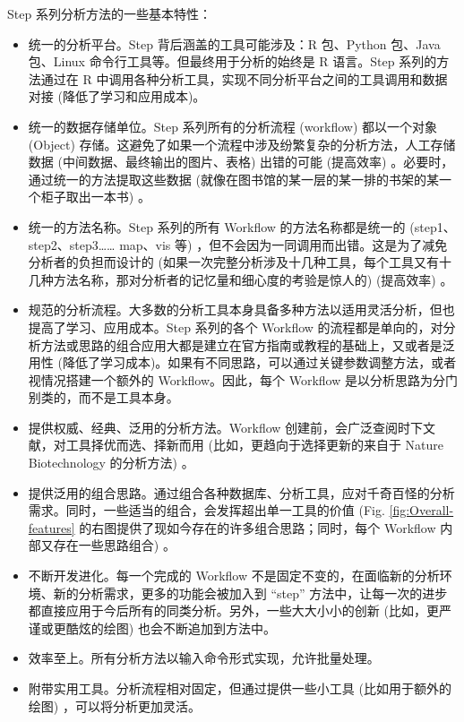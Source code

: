 \documentclass[
]{article}
\begin{document}
Step 系列分析方法的一些基本特性：

\begin{itemize}
\item
  统一的分析平台。Step 背后涵盖的工具可能涉及：R 包、Python 包、Java 包、Linux 命令行工具等。但最终用于分析的始终是 R 语言。Step 系列的方法通过在 R 中调用各种分析工具，实现不同分析平台之间的工具调用和数据对接 (降低了学习和应用成本)。
\item
  统一的数据存储单位。Step 系列所有的分析流程 (workflow) 都以一个对象 (Object) 存储。这避免了如果一个流程中涉及纷繁复杂的分析方法，人工存储数据 (中间数据、最终输出的图片、表格) 出错的可能 (提高效率) 。必要时，通过统一的方法提取这些数据 (就像在图书馆的某一层的某一排的书架的某一个柜子取出一本书) 。
\item
  统一的方法名称。Step 系列的所有 Workflow 的方法名称都是统一的 (step1、step2、step3\ldots\ldots{} map、vis 等) ，但不会因为一同调用而出错。这是为了减免分析者的负担而设计的 (如果一次完整分析涉及十几种工具，每个工具又有十几种方法名称，那对分析者的记忆量和细心度的考验是惊人的) (提高效率) 。
\item
  规范的分析流程。大多数的分析工具本身具备多种方法以适用灵活分析，但也提高了学习、应用成本。Step 系列的各个 Workflow 的流程都是单向的，对分析方法或思路的组合应用大都是建立在官方指南或教程的基础上，又或者是泛用性 (降低了学习成本)。如果有不同思路，可以通过关键参数调整方法，或者视情况搭建一个额外的 Workflow。因此，每个 Workflow 是以分析思路为分门别类的，而不是工具本身。
\item
  提供权威、经典、泛用的分析方法。Workflow 创建前，会广泛查阅时下文献，对工具择优而选、择新而用 (比如，更趋向于选择更新的来自于 Nature Biotechnology 的分析方法) 。
\item
  提供泛用的组合思路。通过组合各种数据库、分析工具，应对千奇百怪的分析需求。同时，一些适当的组合，会发挥超出单一工具的价值 (Fig. \ref{fig:Overall-features} 的右图提供了现如今存在的许多组合思路；同时，每个 Workflow 内部又存在一些思路组合) 。
\item
  不断开发进化。每一个完成的 Workflow 不是固定不变的，在面临新的分析环境、新的分析需求，更多的功能会被加入到 ``step'' 方法中，让每一次的进步都直接应用于今后所有的同类分析。另外，一些大大小小的创新 (比如，更严谨或更酷炫的绘图) 也会不断追加到方法中。
\item
  效率至上。所有分析方法以输入命令形式实现，允许批量处理。
\item
  附带实用工具。分析流程相对固定，但通过提供一些小工具 (比如用于额外的绘图) ，可以将分析更加灵活。
\end{itemize}
\end{document}
